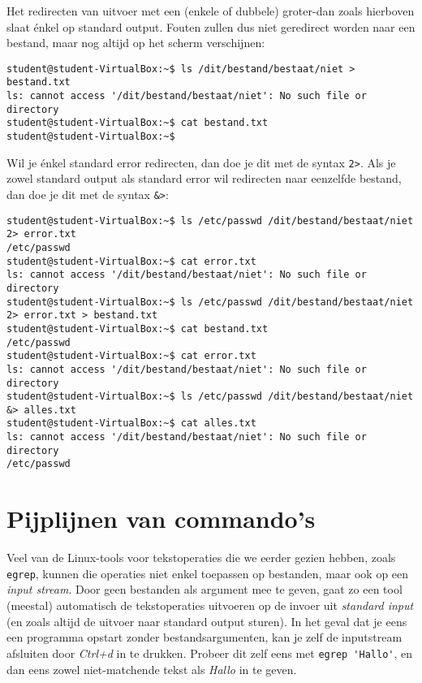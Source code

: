 \documentclass[a4paper,twoside,openany]{memoir}
\begin{document}
Het redirecten van uitvoer met een (enkele of dubbele) groter-dan zoals
hierboven slaat énkel op standard output. Fouten zullen dus niet geredirect
worden naar een bestand, maar nog altijd op het scherm verschijnen:

\begin{verbatim}
student@student-VirtualBox:~$ ls /dit/bestand/bestaat/niet > bestand.txt
ls: cannot access '/dit/bestand/bestaat/niet': No such file or directory
student@student-VirtualBox:~$ cat bestand.txt
student@student-VirtualBox:~$
\end{verbatim}

Wil je énkel standard error redirecten, dan doe je dit met de syntax \verb!2>!.
Als je zowel standard output als standard error wil redirecten naar eenzelfde
bestand, dan doe je dit met de syntax \verb!&>!:

\begin{verbatim}
student@student-VirtualBox:~$ ls /etc/passwd /dit/bestand/bestaat/niet 2> error.txt
/etc/passwd
student@student-VirtualBox:~$ cat error.txt
ls: cannot access '/dit/bestand/bestaat/niet': No such file or directory
student@student-VirtualBox:~$ ls /etc/passwd /dit/bestand/bestaat/niet 2> error.txt > bestand.txt
student@student-VirtualBox:~$ cat bestand.txt
/etc/passwd
student@student-VirtualBox:~$ cat error.txt
ls: cannot access '/dit/bestand/bestaat/niet': No such file or directory
student@student-VirtualBox:~$ ls /etc/passwd /dit/bestand/bestaat/niet &> alles.txt
student@student-VirtualBox:~$ cat alles.txt
ls: cannot access '/dit/bestand/bestaat/niet': No such file or directory
/etc/passwd
\end{verbatim}

\chapter{Pijplijnen van commando's}

Veel van de Linux-tools voor tekstoperaties die we eerder gezien hebben, zoals
\verb!egrep!, kunnen die operaties niet enkel toepassen op bestanden, maar ook
op een \emph{input stream}. Door geen bestanden als argument mee te geven, gaat
zo een tool (meestal) automatisch de tekstoperaties uitvoeren op de invoer uit
\emph{standard input} (en zoals altijd de uitvoer naar standard output sturen).
In het geval dat je eens een programma opstart zonder bestandsargumenten, kan je
zelf de inputstream afsluiten door \emph{Ctrl+d} in te drukken. Probeer dit zelf
eens met \verb!egrep 'Hallo'!, en dan eens zowel niet-matchende tekst als
\emph{Hallo} in te geven.
\end{document}
